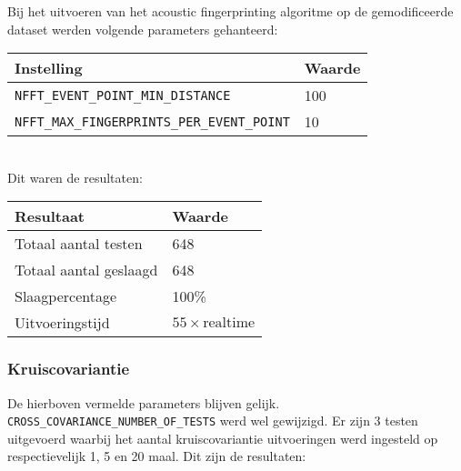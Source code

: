 Bij het uitvoeren van het acoustic fingerprinting algoritme op de gemodificeerde dataset werden volgende parameters gehanteerd:

\begin{tabular}{ l  l}
	\hline
	\textbf{Instelling} & \textbf{Waarde} \\
	\hline
	\texttt{NFFT\_EVENT\_POINT\_MIN\_DISTANCE} & 100 \\
	\texttt{NFFT\_MAX\_FINGERPRINTS\_PER\_EVENT\_POINT} & 10 
\end{tabular}\\

Dit waren de resultaten:

\begin{tabular}{ l  l}
	\hline
	\textbf{Resultaat} & \textbf{Waarde} \\
	\hline
	Totaal aantal testen & 648 \\
	Totaal aantal geslaagd & 648 \\
	Slaagpercentage & 100\% \\
	Uitvoeringstijd & $55 \times \textrm{realtime}$
\end{tabular}

\subsubsection{Kruiscovariantie}

De hierboven vermelde parameters blijven gelijk. \texttt{CROSS\_COVARIANCE\_NUMBER\_OF\_TESTS} werd wel gewijzigd. Er zijn 3 testen uitgevoerd waarbij het aantal kruiscovariantie uitvoeringen werd ingesteld op respectievelijk 1, 5 en 20 maal. Dit zijn de resultaten:

